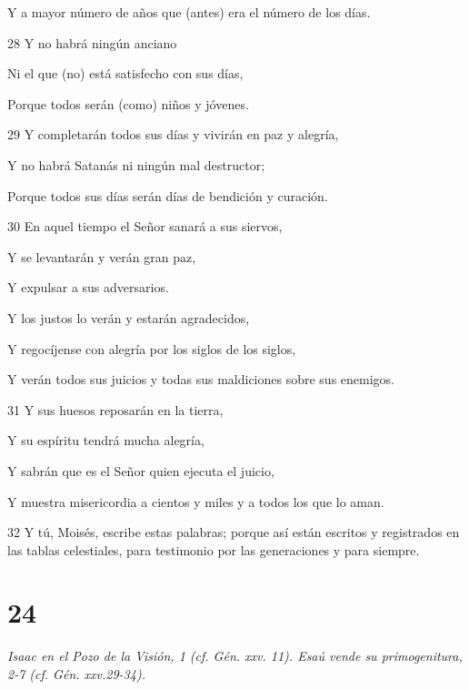 \par     Y a mayor número de años que (antes) era el número de los días.
\par    
\par 28 Y no habrá ningún anciano  
\par     Ni el que (no) está satisfecho con sus días,  
\par     Porque todos serán (como) niños y jóvenes.
\par    
\par 29 Y completarán todos sus días y vivirán en paz y alegría,  
\par     Y no habrá Satanás ni ningún mal destructor;  
\par     Porque todos sus días serán días de bendición y curación.
\par    
\par 30 En aquel tiempo el Señor sanará a sus siervos,  
\par     Y se levantarán y verán gran paz,  
\par     Y expulsar a sus adversarios.
\par    
\par     Y los justos lo verán y estarán agradecidos,  
\par     Y regocíjense con alegría por los siglos de los siglos,  
\par     Y verán todos sus juicios y todas sus maldiciones sobre sus enemigos.
\par    
\par 31 Y sus huesos reposarán en la tierra,  
\par     Y su espíritu tendrá mucha alegría,  
\par     Y sabrán que es el Señor quien ejecuta el juicio,  
\par     Y muestra misericordia a cientos y miles y a todos los que lo aman.
\par    
\par 32 Y tú, Moisés, escribe estas palabras; porque así están escritos y registrados en las tablas celestiales, para testimonio por las generaciones y para siempre.

\chapter{24}

\par \textit{Isaac en el Pozo de la Visión, 1 (cf. Gén. xxv. 11). Esaú vende su primogenitura, 2-7 (cf. Gén. xxv.29-34).}

